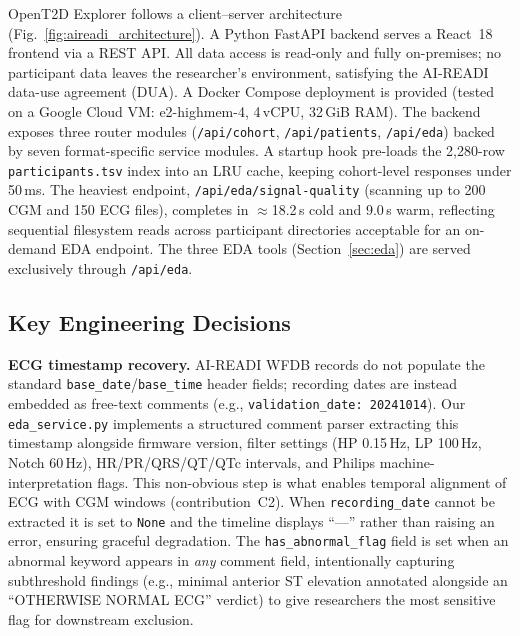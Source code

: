 \documentclass[conference]{IEEEtran}
\begin{document}
OpenT2D Explorer follows a client--server architecture (Fig.~\ref{fig:aireadi_architecture}). A Python FastAPI \cite{noauthor_fastapi_nodate} backend serves a React~18 frontend via a REST API. All data access is read-only and fully on-premises; no participant data leaves the researcher's environment, satisfying the AI-READI data-use agreement (DUA). A Docker Compose deployment is provided (tested on a Google Cloud VM: e2-highmem-4, 4\,vCPU, 32\,GiB RAM). The backend exposes three router modules (\texttt{/api/cohort}, \texttt{/api/patients}, \texttt{/api/eda}) backed by seven format-specific service modules. A startup hook pre-loads the 2,280-row \texttt{participants.tsv} index into an LRU cache, keeping cohort-level responses under 50\,ms. The heaviest endpoint, \texttt{/api/eda/signal-quality} (scanning up to 200 CGM and 150 ECG files), completes in $\approx$18.2\,s cold and 9.0\,s warm, reflecting sequential filesystem reads across participant directories acceptable for an on-demand EDA endpoint. The three EDA tools (Section~\ref{sec:eda}) are served exclusively through \texttt{/api/eda}.

\subsection{Key Engineering Decisions}
\label{sec:engineering}
\textbf{ECG timestamp recovery.} AI-READI WFDB records do not populate the standard \texttt{base\_date}/\texttt{base\_time} header fields; recording dates are instead embedded as free-text comments (e.g., \texttt{validation\_date: 20241014}). Our \texttt{eda\_service.py} implements a structured comment parser extracting this timestamp alongside firmware version, filter settings (HP 0.15\,Hz, LP 100\,Hz, Notch 60\,Hz), HR/PR/QRS/QT/QTc intervals, and Philips machine-interpretation flags. This non-obvious step is what enables temporal alignment of ECG with CGM windows (contribution~C2). When \texttt{recording\_date} cannot be extracted it is set to \texttt{None} and the timeline displays ``---'' rather than raising an error, ensuring graceful degradation. The \texttt{has\_abnormal\_flag} field is set when an abnormal keyword appears in \emph{any} comment field, intentionally capturing subthreshold findings (e.g., minimal anterior ST elevation annotated alongside an ``OTHERWISE NORMAL ECG'' verdict) to give researchers the most sensitive flag for downstream exclusion.
\end{document}
